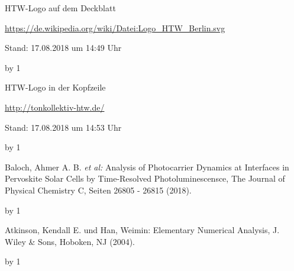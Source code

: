 \documentclass[
	pagesize,
	fontsize=12pt,
	paper=a4,
	oneside,
   reqno
]{scrartcl}
\begin{document}
\begin{thebibliography}{999}
{\setlength{\emergencystretch}{3cm}%

HTW-Logo auf dem Deckblatt\par
\url{https://de.wikipedia.org/wiki/Datei:Logo_HTW_Berlin.svg} \par
 Stand: 17.08.2018 um 14:49 Uhr

\advance\Quellennummer by 1
 
HTW-Logo in der Kopfzeile\par
\url{http://tonkollektiv-htw.de/} \par
 Stand: 17.08.2018 um 14:53 Uhr

\advance\Quellennummer by 1

Baloch, Ahmer A. B. \textit{et al:} \glqq Analysis of Photocarrier Dynamics at Interfaces in Pervoskite Solar Cells by Time-Resolved Photoluminescensce\grqq{}, The Journal of Physical Chemistry C, Seiten 26805 - 26815 (2018).

\advance\Quellennummer by 1

Atkinson, Kendall E. und Han, Weimin: \glqq Elementary Numerical Analysis\grqq{}, J. Wiley \& Sons, Hoboken, NJ (2004).

\advance\Quellennummer by 1

}
\end{thebibliography}
\end{document}

